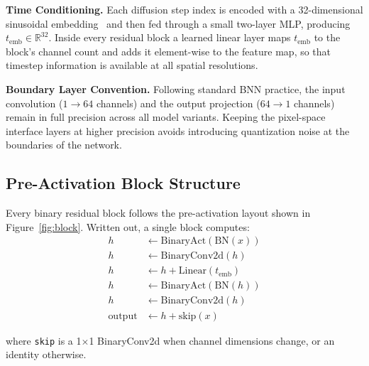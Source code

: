 \documentclass[conference]{IEEEtran}
\begin{document}
\textbf{Time Conditioning.} Each diffusion step index is encoded with a 32-dimensional
sinusoidal embedding~\cite{vaswani2017attention} and then fed through a small two-layer
MLP, producing $t_\text{emb} \in \mathbb{R}^{32}$. Inside every residual block a
learned linear layer maps $t_\text{emb}$ to the block's channel count and adds it
element-wise to the feature map, so that timestep information is available at all
spatial resolutions.

\textbf{Boundary Layer Convention.} Following standard BNN practice, the input
convolution ($1{\to}64$ channels) and the output projection ($64{\to}1$ channels) remain
in full precision across all model variants. Keeping the pixel-space interface layers at
higher precision avoids introducing quantization noise at the boundaries of the network.

\subsection{Pre-Activation Block Structure}

Every binary residual block follows the pre-activation layout shown in
Figure~\ref{fig:block}. Written out, a single block computes:
\begin{align*}
  h &\leftarrow \text{BinaryAct}\!\left(\text{BN}(x)\right) \\
  h &\leftarrow \text{BinaryConv2d}(h) \\
  h &\leftarrow h + \text{Linear}(t_\text{emb}) \\
  h &\leftarrow \text{BinaryAct}\!\left(\text{BN}(h)\right) \\
  h &\leftarrow \text{BinaryConv2d}(h) \\
  \text{output} &\leftarrow h + \text{skip}(x)
\end{align*}

where \texttt{skip} is a 1$\times$1 BinaryConv2d when channel dimensions change, or an
identity otherwise.
\end{document}
